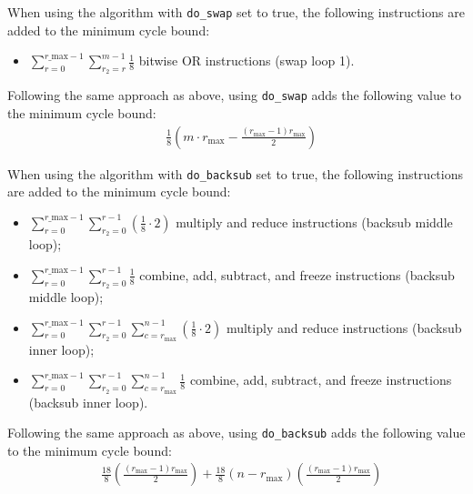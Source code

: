 \documentclass[11pt,a4paper]{report}
\theoremstyle{definition}
\begin{document}
When using the algorithm with \texttt{do\_swap} set to true, the following instructions are added to the minimum cycle bound:
\begin{itemize}
  \item $\sum_{r=0}^{r\_\text{max}-1} \sum_{r_2=r}^{m-1} \frac{1}{8}$ bitwise OR instructions (swap loop 1).
\end{itemize}
Following the same approach as above, using \texttt{do\_swap} adds the following value to the minimum cycle bound:
\begin{align*}
   & \frac{1}{8} \left( m \cdot r_\text{max} - \frac{(r_\text{max} - 1)r_{\text{max}}}{2} \right)
\end{align*}

When using the algorithm with \texttt{do\_backsub} set to true, the following instructions are added to the minimum cycle bound:
\begin{itemize}
  \item $\sum_{r=0}^{r\_\text{max}-1} \sum_{r_2=0}^{r-1} (\frac{1}{8} \cdot 2)$ multiply and reduce instructions (backsub middle loop);
  \item $\sum_{r=0}^{r\_\text{max}-1} \sum_{r_2=0}^{r-1} \frac{1}{8}$ combine, add, subtract, and freeze instructions (backsub middle loop);
  \item $\sum_{r=0}^{r\_\text{max}-1} \sum_{r_2=0}^{r-1} \sum_{c=r_\text{max}}^{n-1} (\frac{1}{8} \cdot 2)$ multiply and reduce instructions (backsub inner loop);
  \item $\sum_{r=0}^{r\_\text{max}-1} \sum_{r_2=0}^{r-1} \sum_{c=r_\text{max}}^{n-1} \frac{1}{8}$ combine, add, subtract, and freeze instructions (backsub inner loop).
\end{itemize}
Following the same approach as above, using \texttt{do\_backsub} adds the following value to the minimum cycle bound:
\begin{align*}
   & \frac{18}{8} \left( \frac{(r_\text{max} - 1)r_{\text{max}}}{2} \right) + \frac{18}{8} \left( n - r_\text{max} \right) \left( \frac{(r_\text{max} - 1)r_{\text{max}}}{2} \right)
\end{align*}
\end{document}
